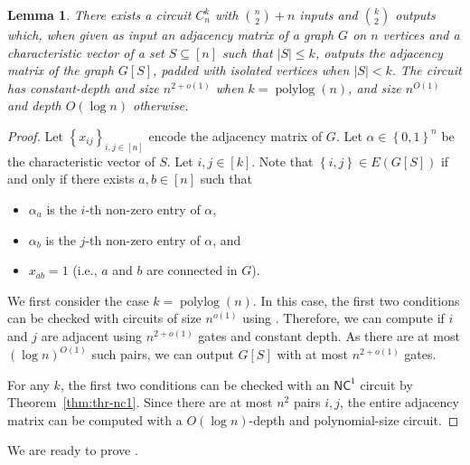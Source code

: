 \documentclass[10pt,a4paper]{article}
\newtheorem{lemma}[theorem]{Lemma}
\DeclareMathOperator{\polylog}{polylog}
\newcommand{\complexityfont}[1]{\mathsf{#1}}
\def\NC           {\complexityfont{NC}}
\def\sseq{\subseteq}
\newcommand{\set}[1]{\left\{#1\right\}}
\newcommand{\card}[1]{\lvert#1\rvert}
\newcommand{\blt}{\set{0,1}}
\begin{document}
\begin{lemma}
    \label{lemma:induced_subgraph_circuit}
    There exists a circuit $C^k_n$ with $\binom{n}{2} + n$ inputs
    and $\binom{k}{2}$ outputs which,
    when given as input
    an adjacency matrix 
    of a graph $G$ on $n$ vertices
    and a characteristic vector of a set $S \sseq [n]$
    such that $\card{S} \leq k$,
    outputs the adjacency matrix of the graph $G[S]$,
    padded with isolated vertices when $\card{S} < k$.
    The circuit has constant-depth and size $n^{2+o(1)}$
    when $k = \polylog(n)$, and
    size $n^{O(1)}$ and depth $O(\log n)$ otherwise.
\end{lemma}
\begin{proof}
    Let $\set{x_{ij}}_{i,j \in [n]}$ encode the adjacency matrix of $G$.
    Let $\alpha \in \blt^n$ be the characteristic vector of $S$.
    Let $i,j \in [k]$.
    Note that $\set{i,j} \in E(G[S])$
    if and only if
    there exists
    $a,b \in [n]$
    such that
    \begin{itemize}
        \item 
            $\alpha_a$ is the $i$-th non-zero entry of $\alpha$,
        \item 
            $\alpha_b$ is the $j$-th non-zero entry of $\alpha$, and
        \item 
            $x_{ab} = 1$ (i.e., $a$ and $b$ are connected in $G$).
    \end{itemize}
    We first consider the case $k = \polylog(n)$.
    In this case,
    the first two conditions can be checked with 
    circuits of size
    $n^{o(1)}$
    using .
    Therefore, we can 
    compute 
    if $i$ and $j$ are adjacent
    using $n^{2+o(1)}$ gates and constant depth.
    As there are at most 
    $(\log n)^{O(1)}$ 
    such pairs,
    we can output $G[S]$
    with at most 
    $n^{2+o(1)}$ gates.

    For any $k$, the first two conditions can be checked with an $\NC^1$
    circuit by Theorem~\ref{thm:thr-nc1}.
    Since there are at most $n^2$ pairs $i,j$, the entire adjacency matrix
    can be computed with a $O(\log n)$-depth and polynomial-size circuit.
\end{proof}

We are ready to prove .
\end{document}
